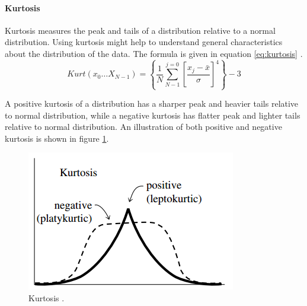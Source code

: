 \documentclass[USenglish]{ifimaster}  %
\begin{document}
	\FloatBarrier
	
\paragraph{Kurtosis}
Kurtosis measures the peak and tails of a distribution relative to a normal distribution. Using kurtosis might help to understand general characteristics about the distribution of the data. The formula is given in equation \ref{eq:kurtosis} \cite{Press:2007:NRE:1403886}.
	\begin{equation}
	Kurt(x_0\dotsc X_{N-1}) = \left \{\frac{1}{N}\sum_{N-1}^{j=0}\left [ \frac{x_j-\bar{x}}{\sigma} \right ]^4 \right \}-3
	\label{eq:kurtosis}
	\end{equation}
	
A positive kurtosis of a distribution has a sharper peak and heavier tails relative to normal distribution, while a negative kurtosis has flatter peak and lighter tails relative to normal distribution. An illustration of both positive and negative kurtosis is shown in figure \ref{fig:kurtosis}.
	
	\begin{figure}[h]
		\centering
		\includegraphics[scale=0.8]{Figures/Kurtosis}
		\caption[Kurtosis]{Kurtosis \cite{Press:2007:NRE:1403886}.}
		\label{fig:kurtosis}
	\end{figure}
	
	
	
	
\end{document}

